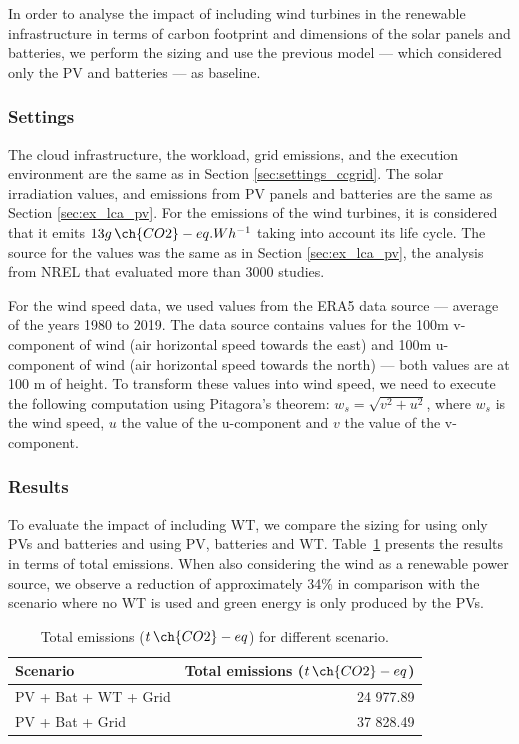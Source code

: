 In order to analyse the impact of including wind turbines in the renewable infrastructure in terms of carbon footprint and dimensions of the solar panels and batteries, we perform the sizing and use the previous model --- which considered only the PV and batteries --- as baseline. 

\subsubsection{Settings}
\label{sec:settings_wt}

The cloud infrastructure, the workload, grid emissions, and the execution environment are the same as in Section \ref{sec:settings_ccgrid}. The solar irradiation values, and emissions from PV panels and batteries are the same as Section \ref{sec:ex_lca_pv}. For the  emissions of the wind turbines, it is considered that it emits $13 g\,\ch{CO2}-eq.Wh^{-1}$ taking into account its life cycle. The source for the values was the same as in Section \ref{sec:ex_lca_pv}, the analysis from NREL that evaluated more than 3000 studies.

For the wind speed data, we used values from the ERA5 data source \cite{era5_wind_2022} --- average of the years 1980 to 2019. The data source contains values for the 100m v-component of wind (air horizontal speed towards the east) and 100m u-component of wind (air horizontal speed towards the north) --- both values are at 100 m of height. To transform these values into wind speed, we need to execute the following computation using Pitagora's theorem: $ w_s = \sqrt{ v^2 + u^2} $, where $w_s$ is the wind speed, $u$ the value of the u-component and $v$ the value of the v-component.

\subsubsection{Results}
\label{sec:results_wt}

To evaluate the impact of including WT, we compare the sizing for using only PVs and batteries and using PV, batteries and WT. Table~\ref{tab:total_wind_and_pv_co2} presents the results in terms of total emissions. When also considering the wind as a renewable power source, we observe a reduction of approximately 34\% in comparison with the scenario where no WT is used and green energy is only produced by the PVs.

\begin{table}[h]  
  \caption{Total emissions ($t\,\ch{CO2}-eq$) for different scenario. }\label{tab:total_wind_and_pv_co2} \centering  
  \begin{tabular}{|l|r|}
  \hline    
  \textbf{Scenario} &   \textbf{Total emissions ($t\,\ch{CO2}-eq$)} \\
  \hline    
  PV + Bat + WT + Grid  & 24 977.89 \\    
  \hline
  PV + Bat + Grid       & 37 828.49 \\    
  \hline
\end{tabular}  
\end{table}


